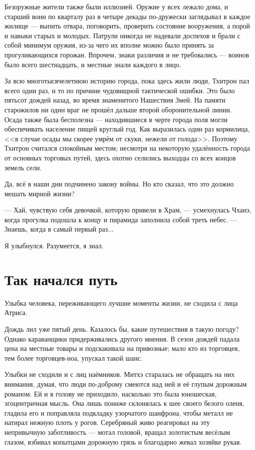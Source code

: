 Безоружные жители также были иллюзией.
Оружие у всех лежало дома, и старший воин по кварталу раз в четыре декады по-дружески заглядывал в каждое жилище --- выпить отвара, поговорить, проверить состояние вооружения, а порой и навыки старых и молодых.
Патрули никогда не надевали доспехов и брали с собой минимум оружия, из-за чего их вполне можно было принять за прогуливающихся горожан.
Впрочем, знаки различия и не требовались --- воинов было всего шестнадцать, и местные знали каждого в лицо.

За всю многотысячелетнюю историю города, пока здесь жили люди, Тхитрон пал всего один раз, и то по причине чудовищной тактической ошибки.
Это было пятьсот дождей назад, во время знаменитого Нашествия Змей.
На памяти старожилов ни один враг не прошёл дальше второй оборонительной линии.
Осада также была бесполезна --- находившиеся в черте города поля могли обеспечивать население пищей круглый год.
Как выразилась один раз кормилица, <<в случае осады мы скорее умрём от скуки, нежели от голода>>.
Поэтому Тхитрон считался спокойным местом;
несмотря на некоторую удалённость города от основных торговых путей, здесь охотно селились выходцы со всех концов земель сели.

Да, всё в наши дни подчинено закону войны.
Но кто сказал, что это должно мешать мирной жизни?

--- Хай, чувствую себя девочкой, которую привели в Храм, --- усмехнулась Чханэ, когда прогулка подошла к концу и пирамида заполнила собой треть небес.
--- Знаешь, когда в самый первый раз...

Я улыбнулся.
Разумеется, я знал.

\section{Так начался путь}

Улыбка человека, переживающего лучшие моменты жизни, не сходила с лица Атриса.

Дождь лил уже пятый день.
Казалось бы, какие путешествия в такую погоду?
Однако караванщики придерживались другого мнения.
В сезон дождей падала цена на местные товары и подскакивала на привозные;
мало кто из торговцев, тем более торговцев-ноа, упускал такой шанс.

Улыбки не сходили и с лиц наёмников.
Митхэ старалась не обращать на них внимания, думая, что люди по-доброму смеются над ней и её глупым дорожным романом.
Ей и в голову не приходило, насколько это была юношеская, эгоцентричная мысль.
Она лишь пониже склонялась к шее своего белого оленя, гладила его и поправляла подкладку узорчатого шанфрона, чтобы металл не натирал нежную плоть у рогов.
Серебряный живо реагировал на эту непривычную заботливость --- мотал головой, вращал золотистым весёлым глазом, взбивал копытцами дорожную грязь и благодарно жевал хозяйке рукав.

